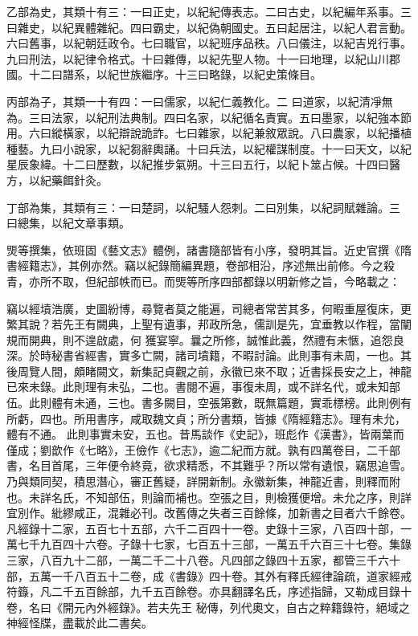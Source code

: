 \begin{pinyinscope}
 乙部為史，其類十有三：一曰正史，以紀紀傳表志。二曰古史，以紀編年系事。三曰雜史，以紀異體雜紀。四曰霸史，以紀偽朝國史。五曰起居注，以紀人君言動。六曰舊事，以紀朝廷政令。七曰職官，以紀班序品秩。八曰儀注，以紀吉兇行事。九曰刑法，以紀律令格式。十曰雜傳，以紀先聖人物。十一曰地理，以紀山川郡國。十二曰譜系，以紀世族繼序。十三曰略錄，以紀史策條目。



 丙部為子，其類一十有四：一曰儒家，以紀仁義教化。二
 曰道家，以紀清凈無為。三曰法家，以紀刑法典制。四曰名家，以紀循名責實。五曰墨家，以紀強本節用。六曰縱橫家，以紀辯說詭詐。七曰雜家，以紀兼敘眾說。八曰農家，以紀播植種藝。九曰小說家，以紀芻辭輿誦。十曰兵法，以紀權謀制度。十一曰天文，以紀星辰象緯。十二曰歷數，以紀推步氣朔。十三曰五行，以紀卜筮占候。十四曰醫方，以紀藥餌針灸。



 丁部為集，其類有三：一曰楚詞，以紀騷人怨刺。二曰別集，以紀詞賦雜論。三
 曰總集，以紀文章事類。



 煚等撰集，依班固《藝文志》體例，諸書隨部皆有小序，發明其旨。近史官撰《隋書經籍志》，其例亦然。竊以紀錄簡編異題，卷部相沿，序述無出前修。今之殺青，亦所不取，但紀部帙而已。而煚等所序四部都錄以明新修之旨，今略載之：



 竊以經墳浩廣，史圖紛博，尋覽者莫之能遍，司總者常苦其多，何暇重屋復床，更繁其說？若先王有闕典，上聖有遺事，邦政所急，儒訓是先，宜垂教以作程，當闡規而開典，則不遑啟處，何
 獲宴寧。曩之所修，誠惟此義，然禮有未愜，追怨良深。於時秘書省經書，實多亡闕，諸司墳籍，不暇討論。此則事有未周，一也。其後周覽人間，頗睹闕文，新集記貞觀之前，永徽已來不取；近書採長安之上，神龍已來未錄。此則理有未弘，二也。書閱不遍，事復未周，或不詳名代，或未知部伍。此則體有未通，三也。書多闕目，空張第數，既無篇題，實乖標榜。此則例有所虧，四也。所用書序，咸取魏文貞；所分書類，皆據《隋經籍志》。理有未允，體有不通。
 此則事實未安，五也。昔馬談作《史記》，班彪作《漢書》，皆兩葉而僅成；劉歆作《七略》，王儉作《七志》，逾二紀而方就。孰有四萬卷目，二千部書，名目首尾，三年便令終竟，欲求精悉，不其難乎？所以常有遺恨，竊思追雪。乃與類同契，積思潛心，審正舊疑，詳開新制。永徽新集，神龍近書，則釋而附也。未詳名氏，不知部伍，則論而補也。空張之目，則檢獲便增。未允之序，則詳宜別作。紕繆咸正，混雜必刊。改舊傳之失者三百餘條，加新書之目者六千餘卷。
 凡經錄十二家，五百七十五部，六千二百四十一卷。史錄十三家，八百四十部，一萬七千九百四十六卷。子錄十七家，七百五十三部，一萬五千六百三十七卷。集錄三家，八百九十二部，一萬二千二十八卷。凡四部之錄四十五家，都管三千六十部，五萬一千八百五十二卷，成《書錄》四十卷。其外有釋氏經律論疏，道家經戒符籙，凡二千五百餘部，九千五百餘卷。亦具翻譯名氏，序述指歸，又勒成目錄十卷，名曰《開元內外經錄》。若夫先王
 秘傳，列代奧文，自古之粹籍錄符，絕域之神經怪牒，盡載於此二書矣。




\end{pinyinscope}
